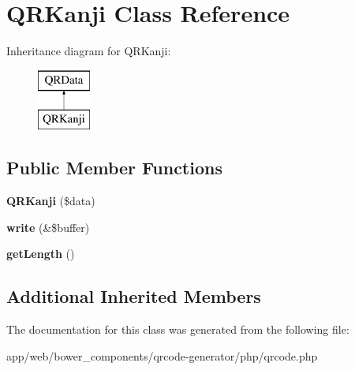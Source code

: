 \hypertarget{class_q_r_kanji}{}\section{Q\+R\+Kanji Class Reference}
\label{class_q_r_kanji}
Inheritance diagram for Q\+R\+Kanji\+:\begin{figure}[H]
\begin{center}
\leavevmode
\includegraphics[height=2.000000cm]{class_q_r_kanji}
\end{center}
\end{figure}
\subsection*{Public Member Functions}
\begin{DoxyCompactItemize}
\item 
\mbox{\label{class_q_r_kanji_a96d5184d3bfe3a327eb8e58425f5e672}} 
{\bfseries Q\+R\+Kanji} (\$data)
\item 
\mbox{\label{class_q_r_kanji_af354ff5b6bb7ade9659711b24b5664e9}} 
{\bfseries write} (\&\$buffer)
\item 
\mbox{\label{class_q_r_kanji_ad5627b0b18e365bc418018d4cd814154}} 
{\bfseries get\+Length} ()
\end{DoxyCompactItemize}
\subsection*{Additional Inherited Members}


The documentation for this class was generated from the following file\+:\begin{DoxyCompactItemize}
\item 
app/web/bower\+\_\+components/qrcode-\/generator/php/qrcode.\+php\end{DoxyCompactItemize}
